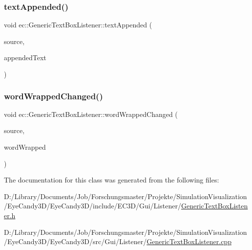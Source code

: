 \subsubsection{\texorpdfstring{text\+Appended()}{textAppended()}}
{\footnotesize\ttfamily void ec\+::\+Generic\+Text\+Box\+Listener\+::text\+Appended (\begin{DoxyParamCaption}\item[{agui\+::\+Text\+Box $\ast$}]{source,  }\item[{const std\+::string \&}]{appended\+Text }\end{DoxyParamCaption})\hspace{0.3cm}{\ttfamily [override]}}

\mbox{\label{classec_1_1_generic_text_box_listener_a96cdc8f0e3932f1cfbe2fd6888818452}} 
\subsubsection{\texorpdfstring{word\+Wrapped\+Changed()}{wordWrappedChanged()}}
{\footnotesize\ttfamily void ec\+::\+Generic\+Text\+Box\+Listener\+::word\+Wrapped\+Changed (\begin{DoxyParamCaption}\item[{agui\+::\+Text\+Box $\ast$}]{source,  }\item[{bool}]{word\+Wrapped }\end{DoxyParamCaption})\hspace{0.3cm}{\ttfamily [override]}}



The documentation for this class was generated from the following files\+:\begin{DoxyCompactItemize}
\item 
D\+:/\+Library/\+Documents/\+Job/\+Forschungsmaster/\+Projekte/\+Simulation\+Visualization/\+Eye\+Candy3\+D/\+Eye\+Candy3\+D/include/\+E\+C3\+D/\+Gui/\+Listener/\mbox{\hyperlink{_generic_text_box_listener_8h}{Generic\+Text\+Box\+Listener.\+h}}\item 
D\+:/\+Library/\+Documents/\+Job/\+Forschungsmaster/\+Projekte/\+Simulation\+Visualization/\+Eye\+Candy3\+D/\+Eye\+Candy3\+D/src/\+Gui/\+Listener/\mbox{\hyperlink{_generic_text_box_listener_8cpp}{Generic\+Text\+Box\+Listener.\+cpp}}\end{DoxyCompactItemize}
